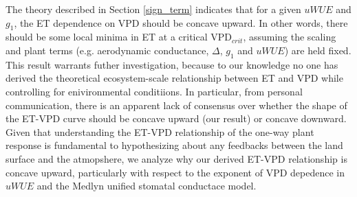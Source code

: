 \documentclass[draft,linenumbers]{agujournal}
\begin{document}
The theory described in Section \ref{sign_term} indicates that for a
given $uWUE$ and $g_1$, the ET dependence on VPD should be concave
upward. In other words, there should be some local minima in ET at a
critical VPD$_{crit}$, assuming the scaling and plant terms  (e.g. aerodynamic
conductance, $\Delta$, $g_1$ and $uWUE$) are held fixed. This result warrants futher
investigation, because to our knowledge no one has derived the
theoretical ecosystem-scale relationship between ET and VPD while
controlling for enivironmental conditiions. In particular, from
personal communication, there is an apparent lack of consensus over
whether the shape of the ET-VPD curve should be concave upward (our
result) or concave downward. Given that understanding the ET-VPD
relationship of the one-way plant response is fundamental to
hypothesizing about any feedbacks between the land surface and the
atmopshere, we analyze why our derived ET-VPD relationship is concave
upward, particularly with respect to the exponent of VPD depedence in
$uWUE$ and the Medlyn unified stomatal conductace model.
\end{document}
